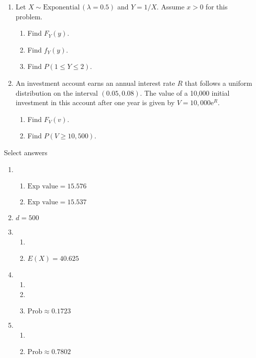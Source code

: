 \documentclass{article}
\newcommand{\follow}[1]{\sim \text{#1}\,}		%
\newcommand{\e}{\mathrm{e}}		%
\begin{document}
\begin{enumerate}
    \item Let $X \follow{Exponential}(\lambda = 0.5)$ and $Y = 1 / X$. Assume $x > 0$ for this problem.%
    \begin{enumerate}
        \item Find $F_Y(y)$.
        \item Find $f_Y(y)$.
        \item Find $P(1 \le Y \le 2)$.
    \end{enumerate}\bigskip
    
    \item An investment account earns an annual interest rate $R$ that follows a uniform distribution on the interval $(0.05, 0.08)$. The value of a 10,000 initial investment in this account after one year is given by $V = 10,000\e^R$.
    \begin{enumerate}
        \item Find $F_V(v)$.
        \item Find $P(V \ge 10,500)$.
    \end{enumerate}\bigskip
  
\end{enumerate}

\newpage

Select answers\bigskip
\begin{enumerate}
    \item 
    \begin{enumerate}
        \item $\text{Exp value} = 15.576$
        \item $\text{Exp value} = 15.537$
    \end{enumerate}
    
    \item $d = 500$
    
    \item 
    \begin{enumerate}
        \item 
        \item $E(X) = 40.625$
    \end{enumerate}
      
    \item
    \begin{enumerate}
        \item 
        \item 
        \item $\text{Prob} \approx 0.1723$
    \end{enumerate}
    
    \item 
    \begin{enumerate}
        \item 
        \item $\text{Prob} \approx 0.7802$
    \end{enumerate}
    
\end{enumerate}
    
\end{document}
